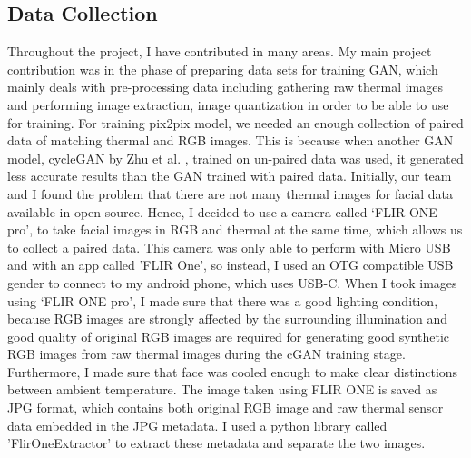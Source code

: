 \documentclass[conference]{IEEEtran}
\begin{document}
\subsection{Data Collection}
Throughout the project, I have contributed in many areas.
My main project contribution was in the phase of preparing data sets for training GAN, which mainly deals with pre-processing data including gathering raw thermal images and performing image extraction, image quantization in order to be able to use for training. For training pix2pix model, we needed an enough collection of paired data of matching thermal and RGB images. This is because when another GAN model, cycleGAN by Zhu et al. \cite{b4}, trained on un-paired data was used, it generated less accurate results than the GAN trained with paired data. Initially, our team and I found the problem that there are not many thermal images for facial data available in open source. Hence, I decided to use a camera called ‘FLIR ONE pro’, to take facial images in RGB and thermal at the same time, which allows us to collect a paired data. This camera was only able to perform with Micro USB and with an app called ’FLIR One’, so instead, I used an OTG compatible USB gender to connect to my android phone, which uses USB-C. When I took images using ‘FLIR ONE pro’, I made sure that there was a good lighting condition, because RGB images are strongly affected by the surrounding illumination and good quality of original RGB images are required for generating good synthetic RGB images from raw thermal images during the cGAN training stage. Furthermore, I made sure that face was cooled enough to make clear distinctions between ambient temperature. The image taken using FLIR ONE is saved as JPG format, which contains both original RGB image and raw thermal sensor data embedded in the JPG metadata. I used a python library called ’FlirOneExtractor’ \cite{b16} to extract these metadata and separate the two images.
\end{document}
